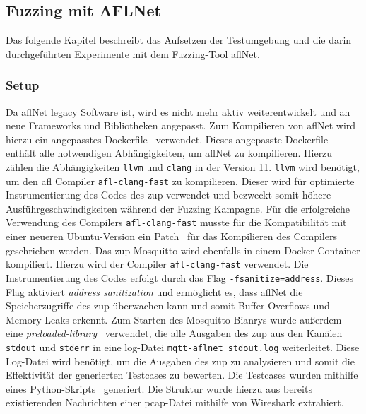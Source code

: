 
\subsection{Fuzzing mit AFLNet}\label{subsec:aflnet}
Das folgende Kapitel beschreibt das Aufsetzen der Testumgebung und die darin durchgeführten Experimente mit dem Fuzzing-Tool
\gls{afl}Net.
\subsubsection{Setup}
Da \gls{afl}Net legacy Software ist, wird es nicht mehr aktiv weiterentwickelt und an neue Frameworks und Bibliotheken
angepasst.
Zum Kompilieren von \gls{afl}Net wird hierzu ein angepasstes Dockerfile~\cite{aflnet-dockerfile} verwendet.
Dieses angepasste Dockerfile enthält alle notwendigen Abhängigkeiten, um \gls{afl}Net zu kompilieren.
Hierzu zählen die Abhängigkeiten \texttt{llvm} und \texttt{clang} in der Version 11.
\texttt{llvm} wird benötigt, um den \gls{afl} Compiler \texttt{afl-clang-fast} zu kompilieren.
Dieser wird für optimierte Instrumentierung des Codes des \gls{zup} verwendet und bezweckt somit höhere Ausführgeschwindigkeiten
während der Fuzzing Kampagne.
Für die erfolgreiche Verwendung des Compilers \texttt{afl-clang-fast} musste für die Kompatibilität mit einer neueren
Ubuntu-Version ein Patch~\cite{llvm-patch} für das Kompilieren des Compilers geschrieben werden.\newline
Das \gls{zup} Mosquitto wird ebenfalls in einem Docker Container kompiliert.
Hierzu wird der Compiler \texttt{afl-clang-fast} verwendet.
Die Instrumentierung des Codes erfolgt durch das Flag \texttt{-fsanitize=address}.
Dieses Flag aktiviert \textit{address sanitization} und ermöglicht es, dass \gls{afl}Net die Speicherzugriffe des \gls{zup}
überwachen kann und somit Buffer Overflows und Memory Leaks erkennt.
Zum Starten des Mosquitto-Bianrys wurde außerdem eine \textit{preloaded-library}~\cite{mqtt-preload} verwendet, die alle Ausgaben des \gls{zup}
aus den Kanälen \texttt{stdout} und \texttt{stderr} in eine log-Datei \texttt{mqtt-aflnet\_stdout.log} weiterleitet.
Diese Log-Datei wird benötigt, um die Ausgaben des \gls{zup} zu analysieren und somit die Effektivität der generierten
Testcases zu bewerten. \newline
Die Testcases wurden mithilfe eines Python-Skripts~\cite{aflnet-generate-test} generiert.
Die Struktur wurde hierzu aus bereits existierenden Nachrichten einer \gls{pcap}-Datei mithilfe von Wireshark extrahiert.
